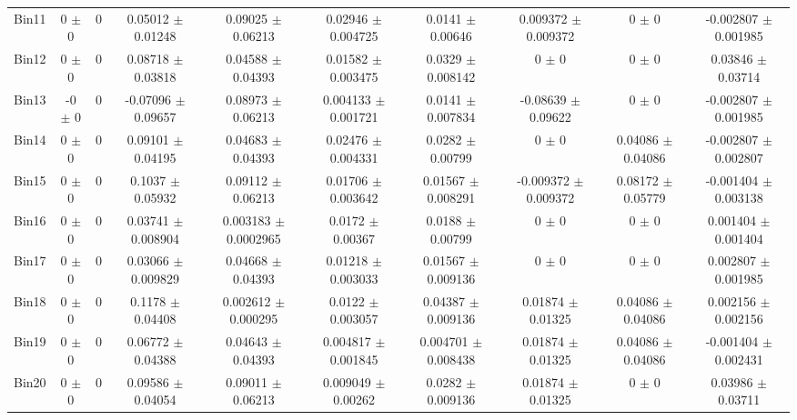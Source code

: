 \begin{tabular}{@{\extracolsep{4pt}}lccccccccc@{}}
     Bin11 & 0 $\pm$ 0 & 0 & 0.05012 $\pm$ 0.01248 & 0.09025 $\pm$ 0.06213 & 0.02946 $\pm$ 0.004725 & 0.0141 $\pm$ 0.00646 & 0.009372 $\pm$ 0.009372 & 0 $\pm$ 0 & -0.002807 $\pm$ 0.001985 \\ 
     Bin12 & 0 $\pm$ 0 & 0 & 0.08718 $\pm$ 0.03818 & 0.04588 $\pm$ 0.04393 & 0.01582 $\pm$ 0.003475 & 0.0329 $\pm$ 0.008142 & 0 $\pm$ 0 & 0 $\pm$ 0 & 0.03846 $\pm$ 0.03714 \\ 
     Bin13 & -0 $\pm$ 0 & 0 & -0.07096 $\pm$ 0.09657 & 0.08973 $\pm$ 0.06213 & 0.004133 $\pm$ 0.001721 & 0.0141 $\pm$ 0.007834 & -0.08639 $\pm$ 0.09622 & 0 $\pm$ 0 & -0.002807 $\pm$ 0.001985 \\ 
     Bin14 & 0 $\pm$ 0 & 0 & 0.09101 $\pm$ 0.04195 & 0.04683 $\pm$ 0.04393 & 0.02476 $\pm$ 0.004331 & 0.0282 $\pm$ 0.00799 & 0 $\pm$ 0 & 0.04086 $\pm$ 0.04086 & -0.002807 $\pm$ 0.002807 \\ 
     Bin15 & 0 $\pm$ 0 & 0 & 0.1037 $\pm$ 0.05932 & 0.09112 $\pm$ 0.06213 & 0.01706 $\pm$ 0.003642 & 0.01567 $\pm$ 0.008291 & -0.009372 $\pm$ 0.009372 & 0.08172 $\pm$ 0.05779 & -0.001404 $\pm$ 0.003138 \\ 
     Bin16 & 0 $\pm$ 0 & 0 & 0.03741 $\pm$ 0.008904 & 0.003183 $\pm$ 0.0002965 & 0.0172 $\pm$ 0.00367 & 0.0188 $\pm$ 0.00799 & 0 $\pm$ 0 & 0 $\pm$ 0 & 0.001404 $\pm$ 0.001404 \\ 
     Bin17 & 0 $\pm$ 0 & 0 & 0.03066 $\pm$ 0.009829 & 0.04668 $\pm$ 0.04393 & 0.01218 $\pm$ 0.003033 & 0.01567 $\pm$ 0.009136 & 0 $\pm$ 0 & 0 $\pm$ 0 & 0.002807 $\pm$ 0.001985 \\ 
     Bin18 & 0 $\pm$ 0 & 0 & 0.1178 $\pm$ 0.04408 & 0.002612 $\pm$ 0.000295 & 0.0122 $\pm$ 0.003057 & 0.04387 $\pm$ 0.009136 & 0.01874 $\pm$ 0.01325 & 0.04086 $\pm$ 0.04086 & 0.002156 $\pm$ 0.002156 \\ 
     Bin19 & 0 $\pm$ 0 & 0 & 0.06772 $\pm$ 0.04388 & 0.04643 $\pm$ 0.04393 & 0.004817 $\pm$ 0.001845 & 0.004701 $\pm$ 0.008438 & 0.01874 $\pm$ 0.01325 & 0.04086 $\pm$ 0.04086 & -0.001404 $\pm$ 0.002431 \\ 
     Bin20 & 0 $\pm$ 0 & 0 & 0.09586 $\pm$ 0.04054 & 0.09011 $\pm$ 0.06213 & 0.009049 $\pm$ 0.00262 & 0.0282 $\pm$ 0.009136 & 0.01874 $\pm$ 0.01325 & 0 $\pm$ 0 & 0.03986 $\pm$ 0.03711 \\ 
\hline\hline
  \end{tabular}
